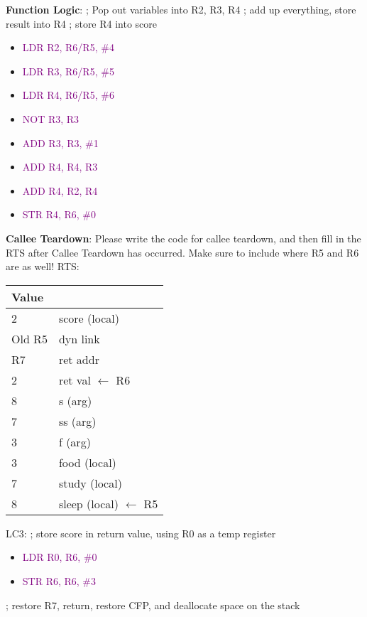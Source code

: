\documentclass{article}
\begin{document}
\textbf{Function Logic}:
\newline
; Pop out variables into R2, R3, R4
\newline
; add up everything, store result into R4
\newline
; store R4 into score
\newline
 \begin{itemize}
    \item \textcolor{purple}{LDR R2, R6/R5, \#4}
    \item \textcolor{purple}{LDR R3, R6/R5, \#5}
    \item \textcolor{purple}{LDR R4, R6/R5, \#6}
    \item \textcolor{purple}{NOT R3, R3}
    \item \textcolor{purple}{ADD R3, R3, \#1}
    \item \textcolor{purple}{ADD R4, R4, R3}
    \item \textcolor{purple}{ADD R4, R2, R4} 
    \item \textcolor{purple}{STR R4, R6, \#0}
    
\end{itemize}

\newpage


\textbf{Callee Teardown}: Please write the code for callee teardown, and then fill in the RTS after Callee Teardown has occurred. Make sure to include where R5 and R6 are as well! \newline
RTS:
\begin{center}

\begin{tabular}{|p{3cm} p{5cm} |} 
\hline
 Value &   \\ [0.5ex] 
 \hline \hline
 2 & score (local)  \\
 \hline
 Old R5 & dyn link \\
 \hline
 R7 & ret addr \\
 \hline
 2 & ret val $\xleftarrow{}$ R6\\
 \hline
 8 & s (arg) \\ 
 \hline
 7 & ss (arg)\\
 \hline
 3 & f (arg) \\
 \hline
 3 & food (local) \\
 \hline
 7 & study (local)\\ [1ex]
 \hline
  8 & sleep (local) $\xleftarrow{}$ R5\\ [1ex]
  \hline
 
\end{tabular}
\end{center}
LC3:
\newline
; store score in return value, using R0 as a temp register
\begin{itemize}
    \item \textcolor{purple}{LDR R0, R6, \#0}
    \item \textcolor{purple}{STR R6, R6, \#3}
\end{itemize}
; restore R7, return, restore CFP, and deallocate space on the stack
\end{document}
